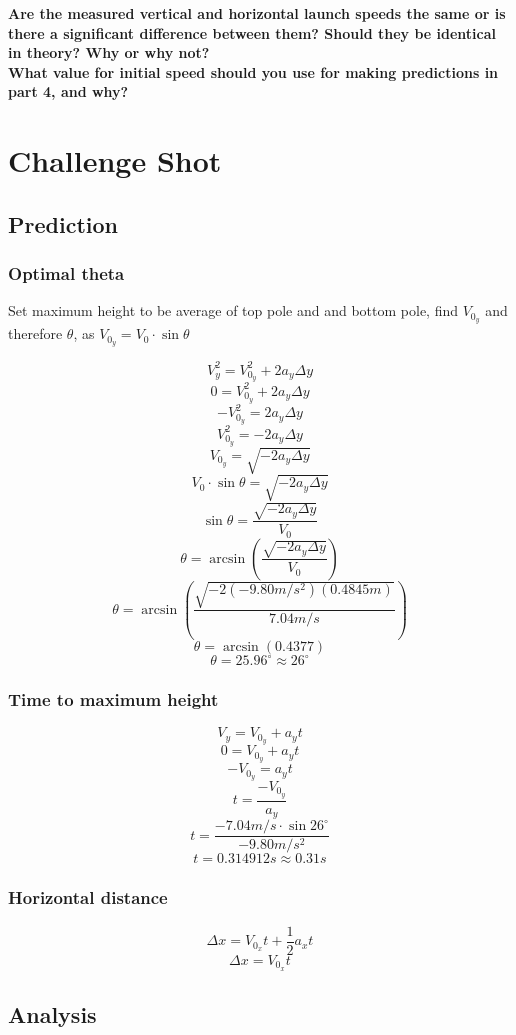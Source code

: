 \documentclass[11pt, letterpaper, includehead]{article}
\begin{document}
\textbf{Are the measured vertical and horizontal launch speeds the same or is there a
significant difference between them? Should they be identical in theory? Why or
why not?}\\

\textbf{What value for initial speed should you use for making predictions in part 4, and
why?}

\section{Challenge Shot} %
\subsection{Prediction} %
\subsubsection{Optimal theta} %
Set maximum height to be average of top pole and and bottom pole, find $V_{0_y}$ and therefore $\theta$,
as $V_{0_y} = V_0\cdot\sin\theta$

$$V_y^2 = V_{0_y}^2 + 2a_y\Delta y$$
$$0 = V_{0_y}^2 + 2a_y\Delta y$$
$$-V_{0_y}^2 = 2a_y\Delta y$$
$$V_{0_y}^2 = -2a_y\Delta y$$
$$V_{0_y} = \sqrt{-2a_y\Delta y}$$
$$V_0\cdot\sin\theta = \sqrt{-2a_y\Delta y}$$
$$\sin\theta = \frac{\sqrt{-2a_y\Delta y}}{V_0}$$
$$\theta = \arcsin\left(\frac{\sqrt{-2a_y\Delta y}}{V_0}\right)$$
$$\theta = \arcsin\left(\frac{\sqrt{-2(-9.80m/s^2)(0.4845m)}}{7.04m/s}\right)$$
$$\theta = \arcsin(0.4377)$$
$$\theta = 25.96^{\circ} \approx 26^{\circ}$$
\subsubsection{Time to maximum height} %
$$V_y = V_{0_y} + a_yt$$
$$0 = V_{0_y} + a_yt$$
$$-V_{0_y} = a_yt$$
$$t = \frac{-V_{0_y}}{a_y}$$
$$t = \frac{-7.04m/s\cdot\sin26^{\circ}}{-9.80m/s^2}$$
$$t = 0.314912s \approx 0.31s$$
\subsubsection{Horizontal distance} %
$$\Delta x = V_{0_x}t + \frac{1}{2}a_xt$$
$$\Delta x = V_{0_x}t$$
\subsection{Analysis}  %
\end{document}
